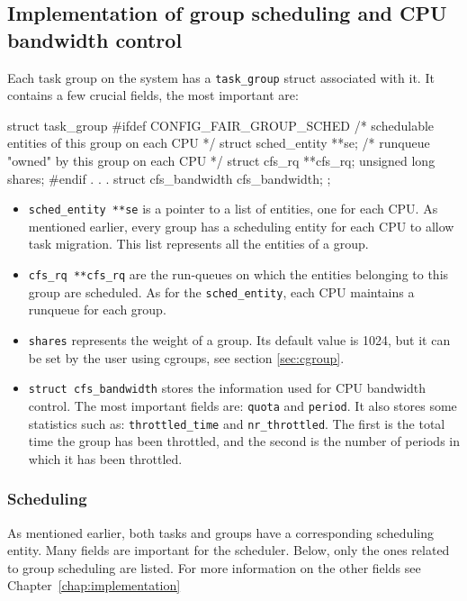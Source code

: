 \subsection{Implementation of group scheduling and CPU bandwidth control}
\label{sec:group_sched_impl}

Each task group on the system has a \verb|task_group| struct associated with it. It contains a few crucial fields, the most important are:
\begin{code}
struct task_group {
	#ifdef CONFIG_FAIR_GROUP_SCHED
	/* schedulable entities of this group on each CPU */
	struct sched_entity	**se;
	/* runqueue "owned" by this group on each CPU */
	struct cfs_rq		**cfs_rq;
	unsigned long		shares;
	#endif
	.
	.
	.
	struct cfs_bandwidth	cfs_bandwidth;
};
\end{code}

\begin{itemize}
    \item \verb|sched_entity **se| is a pointer to a list of entities, one for each CPU. As mentioned earlier, every group has a scheduling entity for each CPU to allow task migration. This list represents all the entities of a group.
    \item \verb|cfs_rq **cfs_rq| are the run-queues on which the entities belonging to this group are scheduled. As for the \verb|sched_entity|, each CPU maintains a runqueue for each group.
    \item \verb|shares| represents the weight of a group. Its default value is 1024, but it can be set by the user using cgroups, see section \ref{sec:cgroup}.
    \item \verb|struct cfs_bandwidth| stores the information used for CPU bandwidth control. The most important fields are: \verb|quota| and \verb|period|. It also stores some statistics such as: \verb|throttled_time| and \verb|nr_throttled|. The first is the total time the group has been throttled, and the second is the number of periods in which it has been throttled.
\end{itemize}

\subsubsection{Scheduling}

As mentioned earlier, both tasks and groups have a corresponding scheduling entity. Many fields are important for the scheduler. Below, only the ones related to group scheduling are listed. For more information on the other fields see Chapter~\ref{chap:implementation}

